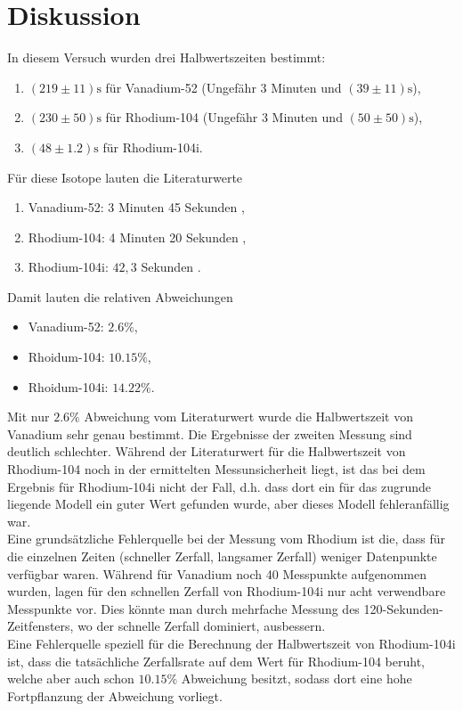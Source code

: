 \section{Diskussion}
\label{sec:Diskussion}

In diesem Versuch wurden drei Halbwertszeiten bestimmt:
\begin{enumerate}
	\item $(219 \pm 11) \si{\second}$ für Vanadium-52 (Ungefähr 3 Minuten und $(39 \pm 11)\si{\second}$),
	\item $(230 \pm 50) \si{\second}$ für Rhodium-104 (Ungefähr 3 Minuten und $(50 \pm 50)\si{\second}$),
	\item $(48 \pm 1.2) \si{\second}$ für Rhodium-104i.
\end{enumerate}
\noindent
Für diese Isotope lauten die Literaturwerte
\begin{enumerate}
	\item Vanadium-52: 3 Minuten 45 Sekunden \cite{chemie-vanadium},
	\item Rhodium-104: 4 Minuten 20 Sekunden \cite{internetchemie-rhodium},
	\item Rhodium-104i: $42,3$ Sekunden \cite{internetchemie-rhodium}.
\end{enumerate}
Damit lauten die relativen Abweichungen
\begin{itemize}
	\item Vanadium-52: $2.6\%$,
	\item Rhoidum-104: $10.15\%$,
	\item Rhoidum-104i: $14.22\%$.
\end{itemize}

\noindent
Mit nur $2.6\%$ Abweichung vom Literaturwert wurde die Halbwertszeit von Vanadium sehr genau bestimmt. Die 
Ergebnisse der zweiten Messung sind deutlich schlechter. Während der Literaturwert für die Halbwertszeit
von Rhodium-104 noch in der ermittelten Messunsicherheit liegt, ist das bei dem Ergebnis für Rhodium-104i nicht
der Fall, d.h. dass dort ein für das zugrunde liegende Modell ein guter Wert gefunden wurde, aber dieses Modell
fehleranfällig war.
\\
Eine grundsätzliche Fehlerquelle bei der Messung vom Rhodium ist die, dass für die einzelnen Zeiten (schneller
Zerfall, langsamer Zerfall) weniger Datenpunkte verfügbar waren. Während für Vanadium noch 40 Messpunkte
aufgenommen wurden, lagen für den schnellen Zerfall von Rhodium-104i nur acht verwendbare Messpunkte vor.
Dies könnte man durch mehrfache Messung des 120-Sekunden-Zeitfensters, wo der schnelle Zerfall dominiert, 
ausbessern.
\\
Eine Fehlerquelle speziell für die Berechnung der Halbwertszeit von Rhodium-104i ist, 
dass die tatsächliche Zerfallsrate
auf dem Wert für Rhodium-104 beruht, welche aber auch schon $10.15\%$ Abweichung besitzt, sodass dort 
eine hohe Fortpflanzung der Abweichung vorliegt.
